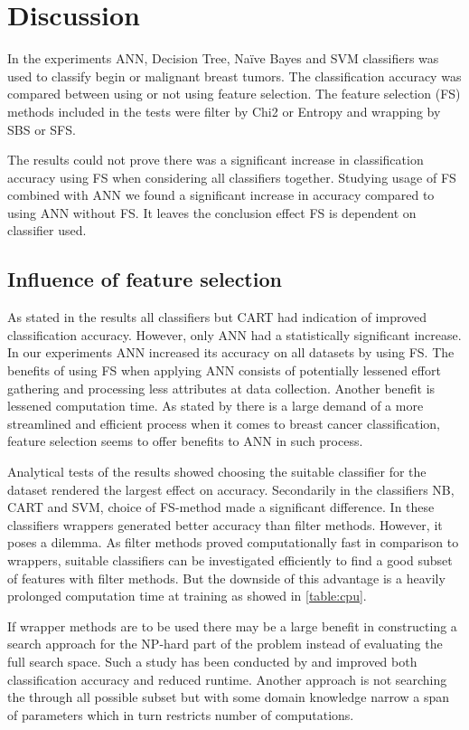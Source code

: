 \chapter{Discussion}

In the experiments ANN, Decision Tree, Na\"ive Bayes and SVM classifiers was used to classify begin or malignant breast tumors. The classification accuracy was compared between using or not using feature selection. The feature selection (FS) methods included in the tests were filter by Chi2 or Entropy and wrapping by SBS or SFS.

The results could not prove there was a significant increase in classification accuracy using FS when considering all classifiers together. Studying usage of FS combined with ANN we found a significant increase in accuracy compared to using ANN without FS. It leaves the conclusion effect FS is dependent on classifier used.

\section{Influence of feature selection}

As stated in the results all classifiers but CART had indication of improved classification accuracy. However, only ANN had a statistically significant increase. In our experiments ANN increased its accuracy on all datasets by using FS. The benefits of using FS when applying ANN consists of potentially lessened effort gathering and processing less attributes at data collection. Another benefit is lessened computation time. As stated by \textcite{martei2018} there is a large demand of a more streamlined and efficient process when it comes to breast cancer classification, feature selection seems to offer benefits to ANN in such process.

Analytical tests of the results showed choosing the suitable classifier for the dataset rendered the largest effect on accuracy. Secondarily in the classifiers NB, CART and SVM, choice of FS-method made a significant difference. In these classifiers wrappers generated better accuracy than filter methods. However, it poses a dilemma. As filter methods proved computationally fast in comparison to wrappers, suitable classifiers can be investigated efficiently to find a good subset of features with filter methods. But the downside of this advantage is a heavily prolonged computation time at training as showed in \ref{table:cpu}.

If wrapper methods are to be used there may be a large benefit in constructing a search approach for the NP-hard part of the problem instead of evaluating the full search space. Such a study has been conducted by \textcite{panthong2015} and improved both classification accuracy and reduced runtime. Another approach is not searching the through all possible subset but with some domain knowledge narrow a span of parameters which in turn restricts number of computations.

